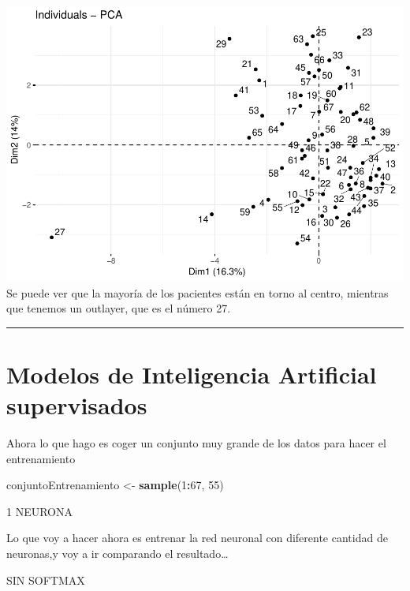 \documentclass[]{article}
\newenvironment{Shaded}{\begin{snugshade}}{\end{snugshade}}
\newcommand{\KeywordTok}[1]{\textcolor[rgb]{0.13,0.29,0.53}{\textbf{#1}}}
\newcommand{\DecValTok}[1]{\textcolor[rgb]{0.00,0.00,0.81}{#1}}
\newcommand{\StringTok}[1]{\textcolor[rgb]{0.31,0.60,0.02}{#1}}
\newcommand{\OperatorTok}[1]{\textcolor[rgb]{0.81,0.36,0.00}{\textbf{#1}}}
\newcommand{\NormalTok}[1]{#1}
\begin{document}
\includegraphics{codigo_files/figure-latex/plot_coordendas_individuos-1.pdf}
Se puede ver que la mayoría de los pacientes están en torno al centro,
mientras que tenemos un outlayer, que es el número 27.

\begin{center}\rule{0.5\linewidth}{\linethickness}\end{center}

\section{Modelos de Inteligencia Artificial
supervisados}\label{modelos-de-inteligencia-artificial-supervisados}

Ahora lo que hago es coger un conjunto muy grande de los datos para
hacer el entrenamiento

\begin{Shaded}
\begin{Highlighting}[]
\NormalTok{conjuntoEntrenamiento <-}\StringTok{ }\KeywordTok{sample}\NormalTok{(}\DecValTok{1}\OperatorTok{:}\DecValTok{67}\NormalTok{, }\DecValTok{55}\NormalTok{)}
\end{Highlighting}
\end{Shaded}

1 NEURONA

Lo que voy a hacer ahora es entrenar la red neuronal con diferente
cantidad de neuronas,y voy a ir comparando el resultado\ldots{}

SIN SOFTMAX
\end{document}
